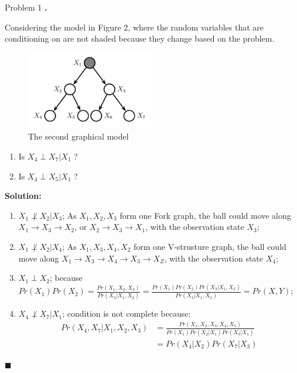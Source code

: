 \documentclass{article}
\newcounter{pcounter}                                   %
\newenvironment{problem}                                %
{                                                       %
    \color{gray}                                        %
    \stepcounter{pcounter}                              %
    \textbf{\arabic{pcounter}.}                         %
}{}                                                     %
\newenvironment{solution}                               %
{\textbf{Solution:} }{$\blacksquare$}                   %
\begin{document}
\begin{section}{Problem 1}
\begin{problem}
            Considering the model in Figure 2, where the random variables that are conditioning on are not shaded because they change based on the problem.
            \begin{figure}[H]
                \label{fig:m2}
                \centering
                \includegraphics[width=0.5\textwidth]{a2_p11_2}
                \caption{The second graphical model}
            \end{figure}
            \begin{enumerate}[label=(\alph*), resume]
                \item Is $X_4 \perp X_7 | X_1$ ?
                \item Is $X_4 \perp X_5 | X_1$ ?
            \end{enumerate}
        \end{problem}

        \begin{solution}
            \begin{enumerate}[label=(\alph*)]
                \item $X_1 \not\perp X_2 | X_3$; As $X_1, X_2, X_3$ form one Fork graph, the ball could move along $X_1 \to X_3 \to X_2$, or $X_2 \to X_3 \to X_1$, with the observation state $X_3$;
                
                \item $X_1 \not\perp X_2 | X_4$; As $X_1, X_3, X_4, X_2$ form one V-strusture graph, the ball could move along $X_1 \to X_3 \to X_4 \to X_3 \to X_Z$, with the observation state $X_4$;
                
                \item $X_1 \perp X_2$; because $Pr(X_1) Pr(X_2) = \frac{Pr(X_1, X_2, X_3)}{Pr(X_3|X_1, X_2)} = \frac{Pr(X_1) Pr(X_2) Pr(X_3|X_1,X_2) }{Pr(X_3|X_1, X_2)} = Pr(X, Y)$;
                
                \item $X_4 \not\perp X_7 | X_1$; condition is not complete because:
                \begin{align*}
                    Pr(X_4, X_7 | X_1, X_2, X_3) &=
                    \frac{Pr(X_1, X_2, X_3, X_4, X_5)}{Pr(X_1) Pr(X_2|X_1) Pr(X_3|X_1)} \\
                    &= Pr(X_4|X_2) Pr(X_7|X_3)
                \end{align*}
                

\end{enumerate}
\end{solution}
\end{section}
\end{document}
